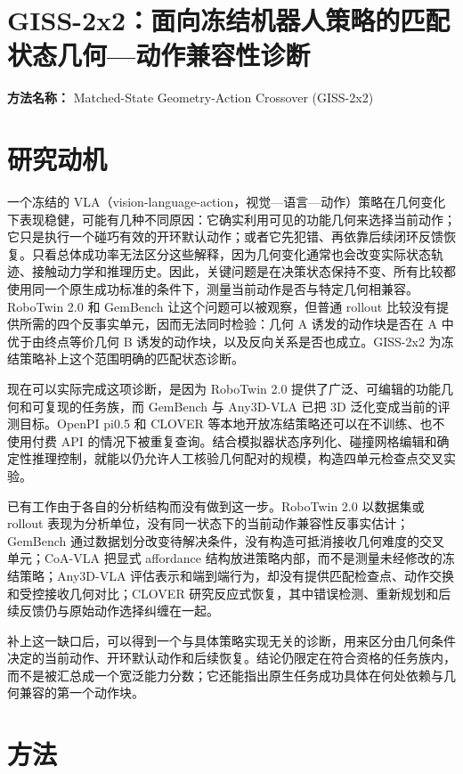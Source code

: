 \documentclass[10pt,a4paper]{article}
\begin{document}
\section*{GISS-2x2：面向冻结机器人策略的匹配状态几何---动作兼容性诊断}
\textbf{方法名称：} Matched-State Geometry-Action Crossover (GISS-2x2)
\section*{研究动机}
一个冻结的 VLA（vision-language-action，视觉---语言---动作）策略在几何变化下表现稳健，可能有几种不同原因：它确实利用可见的功能几何来选择当前动作；它只是执行一个碰巧有效的开环默认动作；或者它先犯错、再依靠后续闭环反馈恢复。只看总体成功率无法区分这些解释，因为几何变化通常也会改变实际状态轨迹、接触动力学和推理历史。因此，关键问题是在决策状态保持不变、所有比较都使用同一个原生成功标准的条件下，测量当前动作是否与特定几何相兼容。RoboTwin 2.0 和 GemBench 让这个问题可以被观察，但普通 rollout 比较没有提供所需的四个反事实单元，因而无法同时检验：几何 A 诱发的动作块是否在 A 中优于由终点等价几何 B 诱发的动作块，以及反向关系是否也成立。GISS-2x2 为冻结策略补上这个范围明确的匹配状态诊断。

现在可以实际完成这项诊断，是因为 RoboTwin 2.0 提供了广泛、可编辑的功能几何和可复现的任务族，而 GemBench 与 Any3D-VLA 已把 3D 泛化变成当前的评测目标。OpenPI pi0.5 和 CLOVER 等本地开放冻结策略还可以在不训练、也不使用付费 API 的情况下被重复查询。结合模拟器状态序列化、碰撞网格编辑和确定性推理控制，就能以仍允许人工核验几何配对的规模，构造四单元检查点交叉实验。

已有工作由于各自的分析结构而没有做到这一步。RoboTwin 2.0 以数据集或 rollout 表现为分析单位，没有同一状态下的当前动作兼容性反事实估计；GemBench 通过数据划分改变待解决条件，没有构造可抵消接收几何难度的交叉单元；CoA-VLA 把显式 affordance 结构放进策略内部，而不是测量未经修改的冻结策略；Any3D-VLA 评估表示和端到端行为，却没有提供匹配检查点、动作交换和受控接收几何对比；CLOVER 研究反应式恢复，其中错误检测、重新规划和后续反馈仍与原始动作选择纠缠在一起。

补上这一缺口后，可以得到一个与具体策略实现无关的诊断，用来区分由几何条件决定的当前动作、开环默认动作和后续恢复。结论仍限定在符合资格的任务族内，而不是被汇总成一个宽泛能力分数；它还能指出原生任务成功具体在何处依赖与几何兼容的第一个动作块。
\section*{方法}
\end{document}
